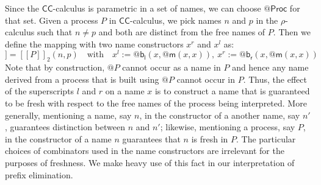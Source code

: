 \documentclass[submission,copyright,creativecommons]{eptcs}
\makeatletter
\newcommand{\ccomb}{$\mathsf{CC}$-calculus}
\newcommand{\ldb}{[\![}
\newcommand{\rdb}{]\!]}
\newcommand{\quotep}[1]{\mathsf{@}#1}
\newcommand{\meaningof}[1]{\ldb #1 \rdb}
\newcommand{\QProc}{\quotep{\mathsf{Proc}}}
\newcommand{\rhoc}{$\rho$-calculus}
\theoremstyle{definition}
\theoremstyle{remark}
\theoremstyle{remark}
\makeatother
\begin{document}
Since the {\ccomb} is parametric in a set of names, we can choose
$\QProc$ for that set.  Given a process $P$ in {\ccomb}, we pick names
$n$ and $p$ in the {\rhoc} such that $n \neq p$ and both are distinct
from the free names of $P$.  Then we define the mapping with two name
constructors $x^r$ and $x^l$ as:
\begin{equation*}
  \meaningof{P} = \meaningof{P}_2(n, p)
  \quad \mbox{with} \quad 
   x^l := \quotep{\mathsf{b}_{\mathsf{l}}(x,\quotep{\mathsf{m}(x,x)})}, \ 
   x^r := \quotep{\mathsf{b}_{\mathsf{r}}(x,\quotep{\mathsf{m}(x,x)})}
\end{equation*}
Note that by construction, $\quotep{P}$ cannot occur as a name in $P$
and hence any name derived from a process that is built using
$\quotep{P}$ cannot occur in $P$. Thus, the effect of the superscripts
$l$ and $r$ on a name $x$ is to construct a name that is guaranteed to
be fresh with respect to the free names of the process being
interpreted. More generally, mentioning a name, say $n$, in the
constructor of a another name, say $n'$, guarantees distinction
between $n$ and $n'$; likewise, mentioning a process, say $P$, in the
constructor of a name $n$ guarantees that $n$ is fresh in $P$. The
particular choices of combinators used in the name
constructors are irrelevant for the purposes of freshness. We
make heavy use of this fact in our interpretation of prefix
elimination.
\end{document}
